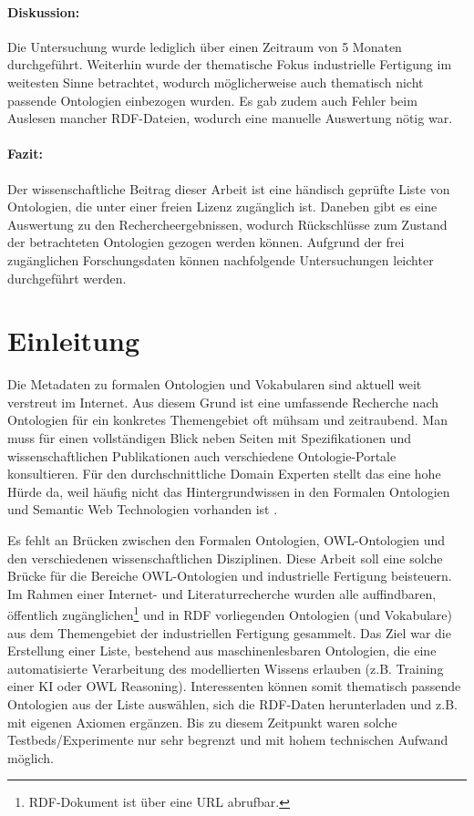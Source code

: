 \documentclass{article}
\begin{document}
\paragraph{Diskussion:} Die Untersuchung wurde lediglich über einen Zeitraum von 5 Monaten durchgeführt.
Weiterhin wurde der thematische Fokus industrielle Fertigung im weitesten Sinne betrachtet, wodurch möglicherweise auch thematisch nicht passende Ontologien einbezogen wurden.
Es gab zudem auch Fehler beim Auslesen mancher RDF-Dateien, wodurch eine manuelle Auswertung nötig war.

\paragraph{Fazit:} Der wissenschaftliche Beitrag dieser Arbeit ist eine händisch geprüfte Liste von Ontologien, die unter einer freien Lizenz zugänglich ist. Daneben gibt es eine Auswertung zu den Rechercheergebnissen, wodurch Rückschlüsse zum Zustand der betrachteten Ontologien gezogen werden können. Aufgrund der frei zugänglichen Forschungsdaten können nachfolgende Untersuchungen leichter durchgeführt werden.

\newpage

\section{Einleitung}

Die Metadaten zu formalen Ontologien und Vokabularen sind aktuell weit verstreut im Internet.
Aus diesem Grund ist eine umfassende Recherche nach Ontologien für ein konkretes Themengebiet oft mühsam und zeitraubend.
Man muss für einen vollständigen Blick neben Seiten mit Spezifikationen und wissenschaftlichen Publikationen auch verschiedene Ontologie-Portale konsultieren.
Für den durchschnittliche Domain Experten stellt das eine hohe Hürde da, weil häufig nicht das Hintergrundwissen in den Formalen Ontologien und Semantic Web Technologien vorhanden ist \cite{sanfilippo2019formal}.

Es fehlt an Brücken zwischen den Formalen Ontologien, OWL-Ontologien und den verschiedenen wissenschaftlichen Disziplinen.
Diese Arbeit soll eine solche Brücke für die Bereiche OWL-Ontologien und industrielle Fertigung beisteuern.
Im Rahmen einer Internet- und Literaturrecherche wurden alle auffindbaren, öffentlich zugänglichen\footnote{RDF-Dokument ist über eine URL abrufbar.} und in RDF vorliegenden Ontologien (und Vokabulare) aus dem Themengebiet der industriellen Fertigung gesammelt.
Das Ziel war die Erstellung einer Liste, bestehend aus maschinenlesbaren Ontologien, die eine automatisierte Verarbeitung des modellierten Wissens erlauben (z.B. Training einer KI oder OWL Reasoning).
Interessenten können somit thematisch passende Ontologien aus der Liste auswählen, sich die RDF-Daten herunterladen und z.B. mit eigenen Axiomen ergänzen.
Bis zu diesem Zeitpunkt waren solche Testbeds/Experimente nur sehr begrenzt und mit hohem technischen Aufwand möglich.
\end{document}
